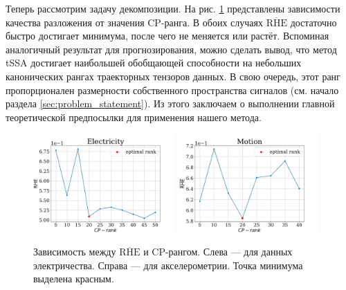 			Теперь рассмотрим задачу декомпозиции. На рис. \ref{fig:decomp_rhe_rank} представлены зависимости качества разложения от значения CP-ранга. В обоих случаях $ \overline{\text{RHE}} $ достаточно быстро достигает минимума, после чего не меняется или растёт. Вспоминая аналогичный результат для прогнозирования, можно сделать вывод, что метод tSSA достигает наибольшей обобщающей способности на небольших канонических рангах траекторных тензоров данных. В свою очередь, этот ранг пропорционален размерности собственного пространства сигналов (см. начало раздела \ref{sec:problem_statement}). Из этого заключаем о выполнении главной теоретической предпосылки для применения нашего метода.
			
			\begin{figure}[h]
				\centering
				\includegraphics[width=0.48\textwidth, keepaspectratio]{../experiments/electricity/tssa/figs/decomposition/RHE_mean.png}
				\includegraphics[width=0.48\textwidth, keepaspectratio]{../experiments/motion_1/tssa/figs/decomposition/RHE_mean.png}
				\caption{Зависимость между $ \overline{\text{RHE}} $ и CP-рангом. Слева --- для данных электричества. Справа --- для акселерометрии. Точка минимума выделена красным.}\label{fig:decomp_rhe_rank}
			\end{figure}
			
